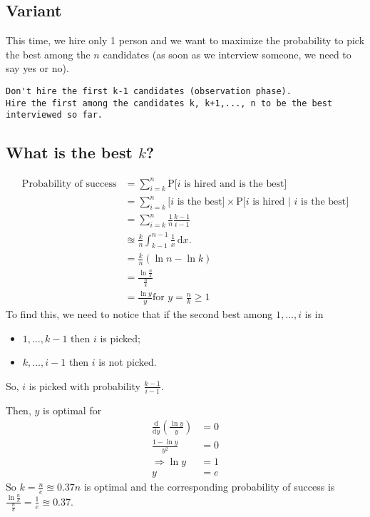 \subsection{Variant}
This time, we hire only 1 person and we want to maximize the probability to pick the best among the $n$ candidates (as soon as we interview someone, we need to say yes or no).

\begin{lstlisting}[label={list:c7:hiring problem},caption=Pseudo-code of the Variant of Hiring Problem algorithm]
Don't hire the first k-1 candidates (observation phase).
Hire the first among the candidates k, k+1,..., n to be the best interviewed so far.
\end{lstlisting}

\subsection{What is the best $k$?}
\begin{align*}
\text{Probability of success} &= \sum_{i=k}^n \text{P[$i$ is hired and is the best]}\\
&= \sum_{i=k}^n  \text{[$i$ is the best]} \times \text{P[$i$ is hired | $i$ is the best]}\\
&= \sum_{i=k}^n  \frac{1}{n} \frac{k-1}{i-1}\\
&\approxeq \frac{k}{n} \int_{k-1}^{n-1} \frac{1}{x} \, \mathrm{d}x.\\
&= \frac{k}{n} (\ln n - \ln k)\\
&= \frac{\ln \frac{n}{k}}{\frac{n}{k}}\\
&= \frac{\ln y}{y} \text{for $y = \frac{n}{k} \geq 1$}
\end{align*}
To find this, we need to notice that if the second best among $1,\ldots,i$ is in 
\begin{itemize}
\item $1,\ldots, k-1$ then $i$ is picked;
\item $k,\ldots, i-1$ then $i$ is not picked.
\end{itemize}
So, $i$ is picked with probability $\frac{k-1}{i-1}$.

Then, $y$ is optimal for 
\begin{align*}
\frac{\mathrm{d}}{\mathrm{d}y} \left(\frac{\ln y}{y} \right) &= 0\\
\frac{1- \ln y}{y^2} &= 0\\
\Rightarrow \ln y &= 1\\
y &= e
\end{align*}
So $k = \frac{n}{e} \approxeq 0.37n$ is optimal and the corresponding probability of success is $\frac{\ln \frac{n}{k}}{\frac{n}{k}} = \frac{1}{e} \approxeq 0.37$.



